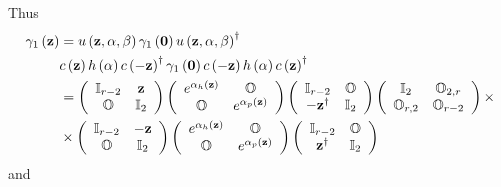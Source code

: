 \documentclass[aps,preprint]{revtex4}%
\begin{document}
Thus
\begin{align}
\gamma_{1}\left(  \mathbf{z}\right)   &  =u\left(  \mathbf{z,\alpha,\beta
}\right)  \gamma_{1}\left(  \mathbf{0}\right)  u\left(  \mathbf{z,\alpha
,\beta}\right)  ^{\dagger}\nonumber\\
&  c\left(  \mathbf{z}\right)  h\left(  \mathbf{\alpha}\right)  c\left(
-\mathbf{z}\right)  ^{\dagger}\gamma_{1}\left(  \mathbf{0}\right)  c\left(
-\mathbf{z}\right)  h\left(  \mathbf{\alpha}\right)  c\left(  \mathbf{z}%
\right)  ^{\dagger}\nonumber\\
&  =\left(
\begin{array}
[c]{cc}%
\mathbb{I}_{r-2} & \mathbf{z}\\
\mathbb{O} & \mathbb{I}_{2}%
\end{array}
\right)  \left(
\begin{array}
[c]{cc}%
e^{\mathbf{\alpha}_{h}\left(  \mathbf{z}\right)  } & \mathbb{O}\\
\mathbb{O} & e^{\mathbf{\alpha}_{p}\left(  \mathbf{z}\right)  }%
\end{array}
\right)  \left(
\begin{array}
[c]{cc}%
\mathbb{I}_{r-2} & \mathbb{O}\\
-\mathbf{z}^{\dagger} & \mathbb{I}_{2}%
\end{array}
\right)  \left(
\begin{array}
[c]{cc}%
\mathbb{I}_{2} & \mathbb{O}_{2,r}\\
\mathbb{O}_{r,2} & \mathbb{O}_{r-2}%
\end{array}
\right)  \times\nonumber\\
&  \times\left(
\begin{array}
[c]{cc}%
\mathbb{I}_{r-2} & -\mathbf{z}\\
\mathbb{O} & \mathbb{I}_{2}%
\end{array}
\right)  \left(
\begin{array}
[c]{cc}%
e^{\mathbf{\alpha}_{h}\left(  \mathbf{z}\right)  } & \mathbb{O}\\
\mathbb{O} & e^{\mathbf{\alpha}_{p}\left(  \mathbf{z}\right)  }%
\end{array}
\right)  \left(
\begin{array}
[c]{cc}%
\mathbb{I}_{r-2} & \mathbb{O}\\
\mathbf{z}^{\dagger} & \mathbb{I}_{2}%
\end{array}
\right)
\end{align}
and
\end{document}
